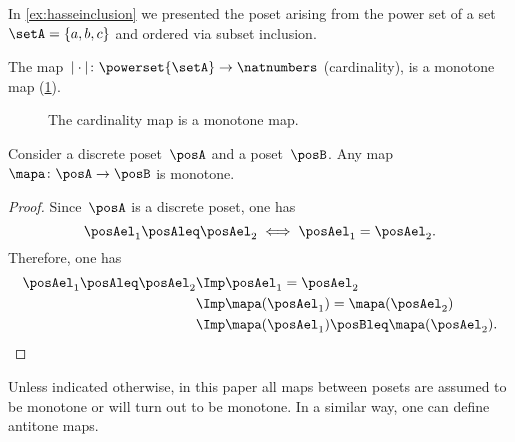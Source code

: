 \begin{example}
    In \cref{ex:hasseinclusion} we presented the poset arising from the power set of a set~$\setA=\{a,b,c\}$ and ordered via subset inclusion.

    The map~$\vert \cdot \vert \colon \powerset{\setA} \to \natnumbers$ (cardinality), is a monotone map (\cref{fig:cardinality}).
    \begin{figure}[h!]
        \centering
        \caption{The cardinality map is a monotone map. }
        \label{fig:cardinality}
    \end{figure}
\end{example}

\begin{lemma}
    Consider a discrete poset~$\posA$ and a poset~$\posB$. Any map~$\mapa \colon \posA\to \posB$ is monotone.
\end{lemma}
\begin{proof}
    Since~$\posA$ is a discrete poset, one has
    \begin{equation}
        \posAel_1\posAleq \posAel_2 \iff \posAel_1=\posAel_2.
    \end{equation}
    Therefore, one has
    \begin{equation}
        \begin{aligned}
            \posAel_1\posAleq \posAel_2 &\Imp \posAel_1=\posAel_2\\
            &\Imp \mapa(\posAel_1)=\mapa(\posAel_2)\\
            &\Imp \mapa(\posAel_1)\posBleq \mapa(\posAel_2).
        \end{aligned}
    \end{equation}
\end{proof}
Unless indicated otherwise, in this paper all maps between posets are assumed to be monotone or will turn out to be monotone. In a similar way, one can define antitone maps.

